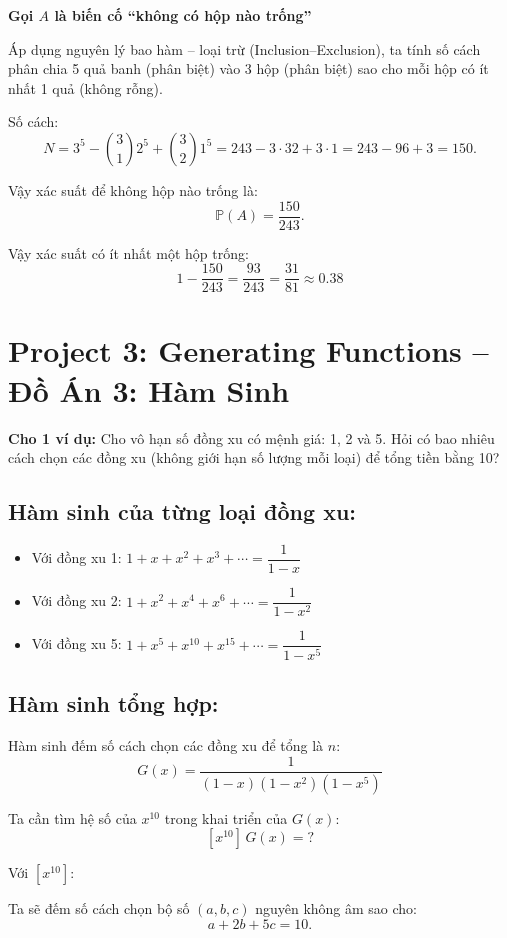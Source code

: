 \documentclass{article}
\begin{document}
	\textbf{Gọi $A$ là biến cố “không có hộp nào trống”}
	
	Áp dụng nguyên lý bao hàm – loại trừ (Inclusion–Exclusion), ta tính số cách phân chia 5 quả banh (phân biệt) vào 3 hộp (phân biệt) sao cho mỗi hộp có ít nhất 1 quả (không rỗng).
	
	Số cách:
	\[
	N = 3^5 - \binom{3}{1} 2^5 + \binom{3}{2} 1^5 = 243 - 3 \cdot 32 + 3 \cdot 1 = 243 - 96 + 3 = 150.
	\]
	
	Vậy xác suất để không hộp nào trống là:
	\[
	\mathbb{P}(A) = \frac{150}{243}.
	\]
	
	Vậy xác suất có ít nhất một hộp trống:
	\[
	1 - \frac{150}{243} = \frac{93}{243} = \frac{31}{81} \approx 0.38
	\]
	
	\section*{Project 3: Generating Functions -- Đồ Án 3: Hàm Sinh}
	
	\textbf{Cho 1 ví dụ:}
		Cho vô hạn số đồng xu có mệnh giá: 1, 2 và 5.  
	Hỏi có bao nhiêu cách chọn các đồng xu (không giới hạn số lượng mỗi loại) để tổng tiền bằng 10?
	
	\subsection*{Hàm sinh của từng loại đồng xu:}
	
	\begin{itemize}
		\item Với đồng xu 1: $1 + x + x^2 + x^3 + \cdots = \dfrac{1}{1 - x}$  
		\item Với đồng xu 2: $1 + x^2 + x^4 + x^6 + \cdots = \dfrac{1}{1 - x^2}$
		\item Với đồng xu 5: $1 + x^5 + x^{10} + x^{15} + \cdots = \dfrac{1}{1 - x^5}$
	\end{itemize}
	
	\subsection*{Hàm sinh tổng hợp:}
	
	Hàm sinh đếm số cách chọn các đồng xu để tổng là $n$:
	\[
	G(x) = \frac{1}{(1 - x)(1 - x^2)(1 - x^5)}
	\]
	
	Ta cần tìm hệ số của $x^{10}$ trong khai triển của $G(x)$:
	\[
	[x^{10}]\,G(x) = ?
	\]
	
	Với $[x^{10}]$:
	
	Ta sẽ đếm số cách chọn bộ số \((a, b, c)\) nguyên không âm sao cho:
	\[
	a + 2b + 5c = 10.
	\]
	
\end{document}
